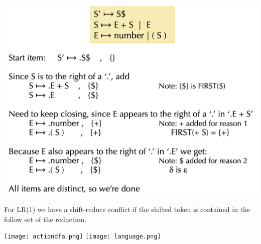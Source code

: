 \vspace{-15pt}
\begin{center}
	\includegraphics[width=0.9\linewidth]{assets/lr1.png}
\end{center}
\vspace{-10pt}
For LR(1) we have a shift-reduce conflict if the shifted token is contained in the follow set of the reduction.

\begin{multicols*}{2}
	\texttt{[image: actiondfa.png]}
	\texttt{[image: language.png]}
\end{multicols*}
